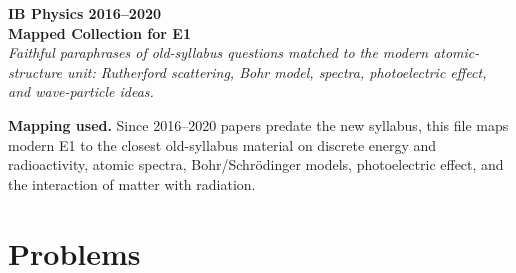 \documentclass[11pt]{article}
\begin{document}
\begin{center}
{\LARGE \textbf{IB Physics 2016--2020}}\\
{\large \textbf{Mapped Collection for E1}}\\
\vspace{0.3em}
\textit{Faithful paraphrases of old-syllabus questions matched to the modern atomic-structure unit: Rutherford scattering, Bohr model, spectra, photoelectric effect, and wave-particle ideas.}
\end{center}

\textbf{Mapping used.} Since 2016--2020 papers predate the new syllabus, this file maps modern E1 to the closest old-syllabus material on discrete energy and radioactivity, atomic spectra, Bohr/Schr\"odinger models, photoelectric effect, and the interaction of matter with radiation.

\section*{Problems}
\end{document}
